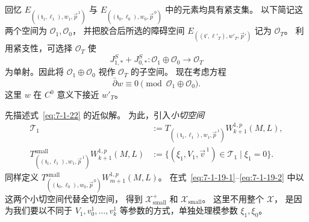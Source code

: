 
回忆
$E_{((\mathfrak t_1,\ell_1),w_1,\vec p^{\,1})}$
与
$E_{((\mathfrak t_0,\ell_0),w_0,\vec p^{\,0})}$
中的元素均具有紧支集。
以下简记这两个空间为 $\mathcal O_1,\mathcal O_0$，
并把胶合后所选的障碍空间
$E_{((\mathfrak t',\ell'_T),w'_T,\vec p')}$
记为 $\mathcal O_T$。
利用紧支性，可选择 $\mathcal O_T$ 使
\[
J^S_{1,*}+J^S_{0,*}\colon
\mathcal O_1\oplus\mathcal O_0\longrightarrow\mathcal O_T
\]
为单射。因此将 $\mathcal O_1\oplus\mathcal O_0$
视作 $\mathcal O_T$ 的子空间。
现在考虑方程
\begin{equation}
\bar\partial w\equiv0\pmod{\mathcal O_1\oplus\mathcal O_0}.
\tag{7.1.22}\label{eq:7-1-22}
\end{equation}
这里 $w$ 在 $C^0$ 意义下接近 $w'_T$。

先描述式~\eqref{eq:7-1-22} 的近似解。
为此，引入\emph{小切空间}
\[
\begin{aligned}
\mathcal T_1
&:=T_{((\mathfrak t_1,\ell_1),w_1,\vec p^{\,1})}
 W_{k+1}^{1,p}(M,L),\\
T^{\mathrm{small}}_{((\mathfrak t_1,\ell_1),w_1,\vec p^{\,1})}
 W_{k+1}^{1,p}(M,L)
&:=\bigl\{(\xi_1,V_1,\vec v^{\,1})\in\mathcal T_1
\mid\xi_1=0\bigr\}.
\end{aligned}
\]
同样定义
$T^{\mathrm{small}}_{((\mathfrak t_0,\ell_0),w_0,\vec p^{\,0})}
 W_{m+1}^{1,p}(M,L)$。
在式~\eqref{eq:7-1-19-1}--\eqref{eq:7-1-19-2}
中以这两个小切空间代替全切空间，
得到 $\mathcal X^+_{\mathrm{small}}$
和 $\mathcal X_{\mathrm{small}}$。
这里不用整个 $\mathcal X$，
是因为我们要以不同于 $V_1,v_0^1,\ldots,v_k^1$
等参数的方式，单独处理模参数 $\xi_1,\xi_0$。

